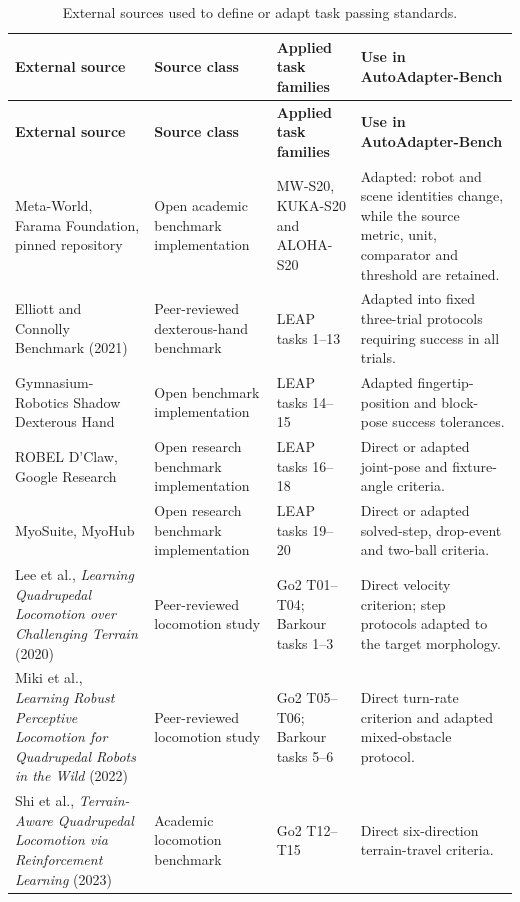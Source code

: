 \clearpage
\begin{landscape}
\begingroup
\scriptsize
{}
\renewcommand{\arraystretch}{1.12}
\begin{longtable}{@{}>{\raggedright\arraybackslash}p{50mm}>{\raggedright\arraybackslash}p{34mm}>{\raggedright\arraybackslash}p{39mm}>{\raggedright\arraybackslash}p{85mm}@{}}
\caption{External sources used to define or adapt task passing standards.}
\label{tab:appendix-standard-sources}\\
\toprule
\textbf{External source} & \textbf{Source class} & \textbf{Applied task families} & \textbf{Use in AutoAdapter-Bench} \\
\midrule
\endfirsthead
\toprule
\textbf{External source} & \textbf{Source class} & \textbf{Applied task families} & \textbf{Use in AutoAdapter-Bench} \\
\midrule
\endhead
\midrule
\endfoot
\bottomrule
\endlastfoot
Meta-World, Farama Foundation, pinned repository & Open academic benchmark implementation & MW-S20, KUKA-S20 and ALOHA-S20 & Adapted: robot and scene identities change, while the source metric, unit, comparator and threshold are retained. \\
Elliott and Connolly Benchmark (2021) & Peer-reviewed dexterous-hand benchmark & LEAP tasks 1--13 & Adapted into fixed three-trial protocols requiring success in all trials. \\
Gymnasium-Robotics Shadow Dexterous Hand & Open benchmark implementation & LEAP tasks 14--15 & Adapted fingertip-position and block-pose success tolerances. \\
ROBEL D'Claw, Google Research & Open research benchmark implementation & LEAP tasks 16--18 & Direct or adapted joint-pose and fixture-angle criteria. \\
MyoSuite, MyoHub & Open research benchmark implementation & LEAP tasks 19--20 & Direct or adapted solved-step, drop-event and two-ball criteria. \\
Lee et al., \emph{Learning Quadrupedal Locomotion over Challenging Terrain} (2020) & Peer-reviewed locomotion study & Go2 T01--T04; Barkour tasks 1--3 & Direct velocity criterion; step protocols adapted to the target morphology. \\
Miki et al., \emph{Learning Robust Perceptive Locomotion for Quadrupedal Robots in the Wild} (2022) & Peer-reviewed locomotion study & Go2 T05--T06; Barkour tasks 5--6 & Direct turn-rate criterion and adapted mixed-obstacle protocol. \\
Shi et al., \emph{Terrain-Aware Quadrupedal Locomotion via Reinforcement Learning} (2023) & Academic locomotion benchmark & Go2 T12--T15 & Direct six-direction terrain-travel criteria. \\

\end{longtable}
\end{landscape}
